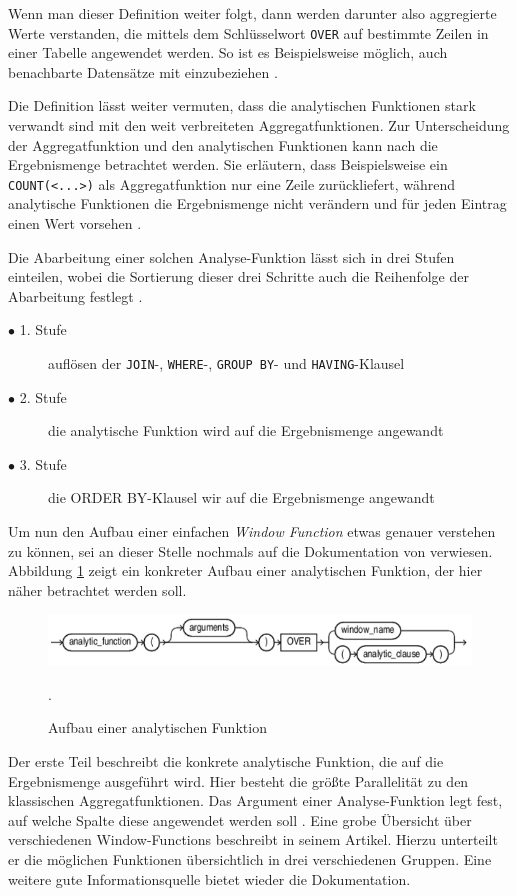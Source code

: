 Wenn man dieser Definition weiter folgt, dann werden darunter also aggregierte
Werte verstanden, die mittels dem Schlüsselwort \texttt{OVER} auf bestimmte
Zeilen in einer Tabelle angewendet werden. So ist es Beispielsweise möglich,
auch benachbarte Datensätze mit einzubeziehen \citep[vgl.][K. 7]{oracle}.

Die Definition lässt weiter vermuten, dass die analytischen Funktionen stark
verwandt sind mit den weit verbreiteten Aggregatfunktionen. Zur Unterscheidung der
Aggregatfunktion und den analytischen Funktionen kann nach \citet[S. 36]{Nuijten2023}
die Ergebnismenge betrachtet werden. Sie erläutern, dass Beispielsweise ein
\texttt{COUNT(<...>)} als Aggregatfunktion nur eine Zeile zurückliefert, während
analytische Funktionen die Ergebnismenge nicht verändern und für jeden Eintrag
einen Wert vorsehen \citep[vgl.][S. 36]{Nuijten2023}.

Die Abarbeitung einer solchen Analyse-Funktion lässt sich in drei Stufen einteilen,
wobei die Sortierung dieser drei Schritte auch die Reihenfolge der Abarbeitung
festlegt \citep[vgl.][S. 35]{Nuijten2023}.
\begin{description}
	\item[$\bullet$ 1. Stufe] auflösen der \texttt{JOIN}-, \texttt{WHERE}-, \texttt{GROUP
		BY}- und \texttt{HAVING}-Klausel

	\item[$\bullet$ 2. Stufe] die analytische Funktion wird auf die Ergebnismenge angewandt

	\item[$\bullet$ 3. Stufe] die ORDER BY-Klausel wir auf die Ergebnismenge angewandt
\end{description}
Um nun den Aufbau einer einfachen \textit{Window Function} etwas genauer verstehen
zu können, sei an dieser Stelle nochmals auf die Dokumentation von \citet[K.~7]{oracle}
verwiesen. Abbildung \ref{fig:aufbauAnalyticFunction} zeigt ein konkreter Aufbau
einer analytischen Funktion, der hier näher betrachtet werden soll.
\begin{figure}[h]
	\centering
	\includegraphics[scale=0.5]{img/aufbauAnalyticFunction.jpg}
	\caption{ Aufbau einer analytischen Funktion \citep[vgl.][K. 7]{oracle}}
	. \label{fig:aufbauAnalyticFunction}
\end{figure}
Der erste Teil beschreibt die konkrete analytische Funktion, die auf die Ergebnismenge
ausgeführt wird. Hier besteht die größte Parallelität zu den klassischen
Aggregatfunktionen. Das Argument einer Analyse-Funktion legt fest, auf welche
Spalte diese angewendet werden soll \citep[vgl.][S.~110]{schicker2017datenbanken}.
Eine grobe Übersicht über verschiedenen Window-Functions beschreibt \citet[]{ibrahaim23}
in seinem Artikel. Hierzu unterteilt er die möglichen Funktionen übersichtlich
in drei verschiedenen Gruppen. Eine weitere gute Informationsquelle bietet wieder
die \citet[K.~7]{oracle} Dokumentation.

